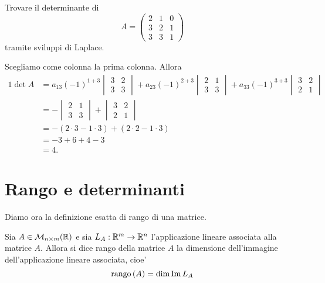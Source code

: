 \begin{example}
    Trovare il determinante di \[
    A = \begin{pmatrix}
        2 & 1 & 0 \\ 3 & 2 & 1 \\ 3 & 3 & 1
    \end{pmatrix}    
    \] tramite sviluppi di Laplace.
\end{example}
\begin{solution}
    Scegliamo come colonna la prima colonna.
    Allora \begin{alignat*}
        {1}
        \det A &= a_{13}(-1)^{1+3} \begin{vmatrix}  3 & 2 \\ 3 & 3 \end{vmatrix} + a_{23}(-1)^{2+3} \begin{vmatrix}  2 & 1 \\ 3 & 3 \end{vmatrix} + a_{33}(-1)^{3+3} \begin{vmatrix}  3 & 2 \\ 2 & 1 \end{vmatrix}\\
            &= -\begin{vmatrix}  2 & 1 \\ 3 & 3 \end{vmatrix} + \begin{vmatrix} 3 & 2 \\ 2 & 1 \end{vmatrix} \\
            &= -(2 \cdot 3 - 1 \cdot 3) + (2 \cdot 2 - 1 \cdot 3)\\
            &= -3 + 6 + 4 - 3\\
            &= 4.
    \end{alignat*}
\end{solution}

\section{Rango e determinanti}

Diamo ora la definizione esatta di rango di una matrice.

\begin{definition}
    Sia $A \in \mathcal{M}_{n \times m}(\mathbb{R})$ e sia $L_A : \mathbb{R}^m \to \mathbb{R}^n$ l'applicazione lineare associata alla matrice $A$. Allora si dice rango della matrice $A$ la dimensione dell'immagine dell'applicazione lineare associata, cioe'
    \begin{equation}
        \operatorname{rango}\left( A \right) = \dim \operatorname{Im}L_A
    \end{equation}
\end{definition}

